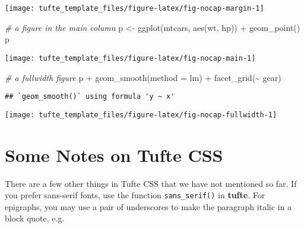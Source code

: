 \documentclass[a4paper,14pt]{tufte-handout}
\newenvironment{Shaded}{}{}
\newcommand{\AttributeTok}[1]{\textcolor[rgb]{0.49,0.56,0.16}{#1}}
\newcommand{\CommentTok}[1]{\textcolor[rgb]{0.38,0.63,0.69}{\textit{#1}}}
\newcommand{\FunctionTok}[1]{\textcolor[rgb]{0.02,0.16,0.49}{#1}}
\newcommand{\NormalTok}[1]{#1}
\newcommand{\OtherTok}[1]{\textcolor[rgb]{0.00,0.44,0.13}{#1}}
\newcommand{\SpecialCharTok}[1]{\textcolor[rgb]{0.25,0.44,0.63}{#1}}
\newcommand{\StringTok}[1]{\textcolor[rgb]{0.25,0.44,0.63}{#1}}
\begin{document}
\begin{marginfigure}

{\centering \texttt{[image: tufte\_template\_files/figure-latex/fig-nocap-margin-1]} 

}

\end{marginfigure}

\begin{Shaded}
\begin{Highlighting}[numbers=left,,]
\CommentTok{\# a figure in the main column}
\NormalTok{p }\OtherTok{\textless{}{-}} \FunctionTok{ggplot}\NormalTok{(mtcars, }\FunctionTok{aes}\NormalTok{(wt, hp)) }\SpecialCharTok{+} \FunctionTok{geom\_point}\NormalTok{()}
\NormalTok{p}
\end{Highlighting}
\end{Shaded}

\begin{center}\texttt{[image: tufte\_template\_files/figure-latex/fig-nocap-main-1]} \end{center}

\begin{Shaded}
\begin{Highlighting}[numbers=left,,]
\CommentTok{\# a fullwidth figure}
\NormalTok{p }\SpecialCharTok{+} \FunctionTok{geom\_smooth}\NormalTok{(}\AttributeTok{method =} \StringTok{\textquotesingle{}lm\textquotesingle{}}\NormalTok{) }\SpecialCharTok{+} \FunctionTok{facet\_grid}\NormalTok{(}\SpecialCharTok{\textasciitilde{}}\NormalTok{ gear)}
\end{Highlighting}
\end{Shaded}

\begin{verbatim}
## `geom_smooth()` using formula 'y ~ x'
\end{verbatim}

\begin{figure*}

{\centering \texttt{[image: tufte\_template\_files/figure-latex/fig-nocap-fullwidth-1]} 

}

\end{figure*}

\hypertarget{some-notes-on-tufte-css}{%
\section{Some Notes on Tufte CSS}\label{some-notes-on-tufte-css}}

There are a few other things in Tufte CSS that we have not mentioned so
far. If you prefer \textsf{sans-serif fonts}, use the function
\texttt{sans\_serif()} in \textbf{tufte}. For epigraphs, you may use a
pair of underscores to make the paragraph italic in a block quote, e.g.
\end{document}
